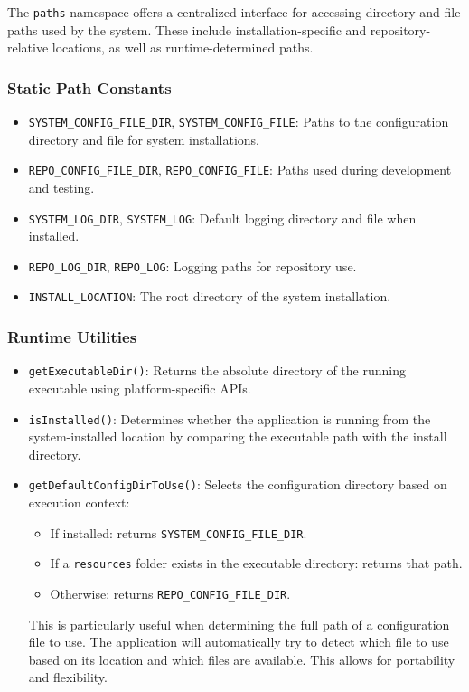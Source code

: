 The \texttt{paths} namespace offers a centralized interface for accessing directory and file paths used by the system. These include installation-specific and repository-relative locations, as well as runtime-determined paths.

\subsubsection*{Static Path Constants}
\begin{itemize}\itemsep0em
	\item \texttt{SYSTEM\_CONFIG\_FILE\_DIR}, \texttt{SYSTEM\_CONFIG\_FILE}: Paths to the configuration directory and file for system installations.
	\item \texttt{REPO\_CONFIG\_FILE\_DIR}, \texttt{REPO\_CONFIG\_FILE}: Paths used during development and testing.
	\item \texttt{SYSTEM\_LOG\_DIR}, \texttt{SYSTEM\_LOG}: Default logging directory and file when installed.
	\item \texttt{REPO\_LOG\_DIR}, \texttt{REPO\_LOG}: Logging paths for repository use.
	\item \texttt{INSTALL\_LOCATION}: The root directory of the system installation.
\end{itemize}

\subsubsection*{Runtime Utilities} \label{section:global_constants_utilities}
\begin{itemize}\itemsep0em
	\item \texttt{getExecutableDir()}: Returns the absolute directory of the running executable using platform-specific APIs.
	
	\item \texttt{isInstalled()}: Determines whether the application is running from the system-installed location by comparing the executable path with the install directory.
	
	\item \texttt{getDefaultConfigDirToUse()}: Selects the configuration directory based on execution context:
	\begin{itemize}\itemsep0em
		\item If installed: returns \texttt{SYSTEM\_CONFIG\_FILE\_DIR}.
		\item If a \texttt{resources} folder exists in the executable directory: returns that path.
		\item Otherwise: returns \texttt{REPO\_CONFIG\_FILE\_DIR}.
	\end{itemize}
	This is particularly useful when determining the full path of a configuration file to use. The application will automatically try to detect which file to use based on its location and which files are available. This allows for portability and flexibility.
\end{itemize}

